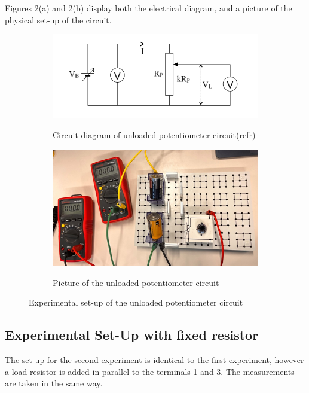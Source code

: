 \documentclass[a4paper]{article}
\begin{document}
Figures 2(a) and 2(b) display both
the electrical diagram, and a picture of the physical set-up of the circuit.
\begin{figure}
    \centering
    \begin{subfigure}{.5\textwidth}
        \centering
        \includegraphics[width=0.8\linewidth]{Unloaded pot circuit.png}
        \label{fig:2a}
        \caption{Circuit diagram of unloaded potentiometer circuit(refr)}   
    \end{subfigure}%
    \begin{subfigure}{.5\textwidth}
        \centering
        \includegraphics[width = 0.8\linewidth]{unloaded pot picture.png}
        \label{fig2:b}
        \caption{Picture of the unloaded potentiometer circuit}
    \end{subfigure}
    \caption{Experimental set-up of the unloaded potentiometer circuit}
\end{figure}
\subsection{Experimental Set-Up with fixed resistor}
The set-up for the second experiment is identical to the first experiment,
however a load resistor is added in parallel to the terminals 1 and 3. The
measurements are taken in the same way.
\end{document}
